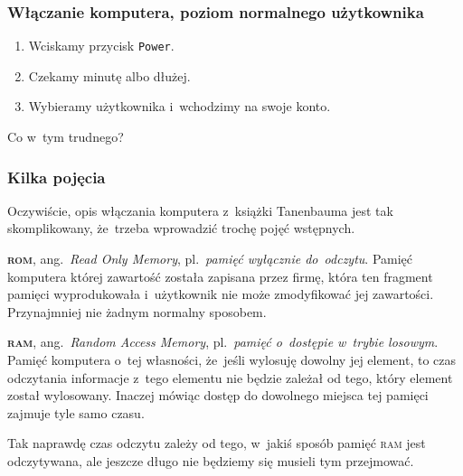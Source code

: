 \documentclass[10pt,t]{beamer}
\begin{document}
\begin{frame}
  \frametitle{Włączanie komputera, poziom normalnego użytkownika}


  \begin{enumerate}

  \item Wciskamy przycisk \texttt{Power}.



  \item Czekamy minutę albo dłużej.



  \item Wybieramy użytkownika i~wchodzimy na swoje konto.

  \end{enumerate}

  Co w~tym trudnego?

\end{frame}





\begin{frame}
  \frametitle{Kilka pojęcia}


  Oczywiście, opis włączania komputera z~książki Tanenbauma jest tak
  skomplikowany, że~trzeba wprowadzić trochę pojęć wstępnych.

  \textbf{\textsc{rom}}, ang.~\textit{Read Only Memory}, pl.~\textit{pamięć
    wyłącznie do~odczytu}. Pamięć komputera której zawartość została
  zapisana przez firmę, która ten fragment pamięci wyprodukowała
  i~użytkownik nie może zmodyfikować jej zawartości. Przynajmniej nie żadnym
  normalny sposobem.

  \textbf{\textsc{ram}}, ang.~\textit{Random Access Memory},
  pl.~\textit{pamięć o~dostępie w~trybie losowym}. Pamięć komputera o~tej
  własności, że~jeśli wylosuję dowolny jej element, to czas odczytania
  informacje z~tego elementu nie będzie zależał od tego, który element
  został wylosowany. Inaczej mówiąc dostęp do dowolnego miejsca tej pamięci
  zajmuje tyle samo czasu.

  Tak naprawdę czas odczytu zależy od tego, w~jakiś sposób pamięć
  \textsc{ram} jest odczytywana, ale jeszcze długo nie będziemy się musieli
  tym przejmować.

\end{frame}
\end{document}
